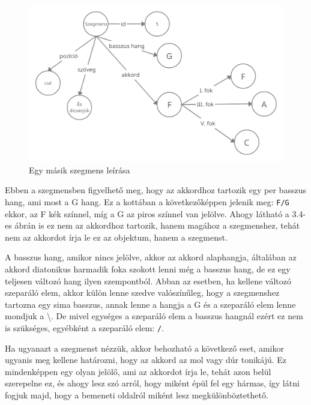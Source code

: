 \begin{figure}[h]
	\includegraphics[scale=0.3]{images/rdf_graph_3.png}
	\caption{Egy másik szegmens leírása}
	\label{fig:graph3}
\end{figure}

Ebben a szegmensben figyelhető meg, hogy az akkordhoz tartozik egy per basszus hang, ami most a G hang. Ez a kottában a következőképpen jelenik meg: \texttt{F/G} ekkor, az F kék színnel, míg a G az piros színnel van jelölve. Ahogy látható a 3.4-es ábrán is ez nem az akkordhoz tartozik, hanem magához a szegmenshez, tehát nem az akkordot írja le ez az objektum, hanem a szegmenst. \par
A basszus hang, amikor nincs jelölve, akkor az akkord alaphangja, általában az akkord diatonikus harmadik foka szokott lenni még a basszus hang, de ez egy teljesen változó hang ilyen szempontból. Abban az esetben, ha kellene változó szeparáló elem, akkor külön lenne szedve valószínűleg, hogy a szegmenshez tartozna egy sima basszus, annak lenne a hangja a G és a szeparáló elem lenne mondjuk a \textbackslash. De mivel egységes a szeparáló elem a basszus hangnál ezért ez nem is szükséges, egyébként a szeparáló elem: \texttt{/}.
\par
Ha ugyanazt a szegmenst nézzük, akkor behozható a következő eset, amikor ugyanis meg kellene határozni, hogy az akkord az mol vagy dúr tonikájú. Ez mindenképpen egy olyan jelölő, ami az akkordot írja le, tehát azon belül szerepelne ez, és ahogy lesz szó arról, hogy miként épül fel egy hármas, így látni fogjuk majd, hogy a bemeneti oldalról miként lesz megkülönböztethető.
\par
\newpage

